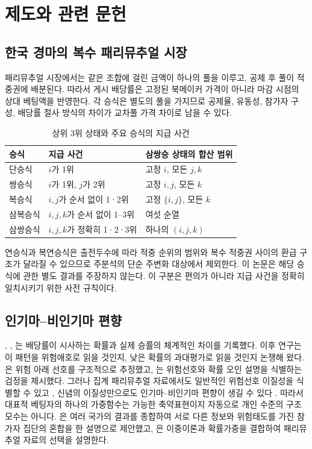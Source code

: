 \section{제도와 관련 문헌}

\subsection{한국 경마의 복수 패리뮤추얼 시장}

패리뮤추얼 시장에서는 같은 조합에 걸린 금액이 하나의 풀을 이루고, 공제 후
풀이 적중권에 배분된다. 따라서 게시 배당률은 고정된 북메이커 가격이 아니라
마감 시점의 상대 베팅액을 반영한다. 각 승식은 별도의 풀을 가지므로 공제율,
유동성, 참가자 구성, 배당률 절사 방식의 차이가 교차풀 가격 차이로 남을 수
있다.

\begin{table}[htbp]
\centering
\caption{상위 3위 상태와 주요 승식의 지급 사건}
\label{tab:market-events}
\begin{tabular}{lll}
\toprule
승식 & 지급 사건 & 삼쌍승 상태의 합산 범위 \\
\midrule
단승식 & $i$가 1위 & 고정 $i$, 모든 $j,k$ \\
쌍승식 & $i$가 1위, $j$가 2위 & 고정 $i,j$, 모든 $k$ \\
복승식 & $i,j$가 순서 없이 1·2위 & 고정 $\{i,j\}$, 모든 $k$ \\
삼복승식 & $i,j,k$가 순서 없이 1--3위 & 여섯 순열 \\
삼쌍승식 & $i,j,k$가 정확히 1·2·3위 & 하나의 $(i,j,k)$ \\
\bottomrule
\end{tabular}
\end{table}

연승식과 복연승식은 출전두수에 따라 적중 순위의 범위와 복수 적중권 사이의
환급 구조가 달라질 수 있으므로 주분석의 단순 주변화 대상에서 제외한다. 이
논문은 해당 승식에 관한 별도 결과를 주장하지 않는다. 이 구분은 편의가 아니라
지급 사건을 정확히 일치시키기 위한 사전 규칙이다.

\subsection{인기마--비인기마 편향}

\citet{griffith1949}, \citet{weitzman1965}, \citet{ali1977}는 배당률이
시사하는 확률과 실제 승률의 체계적인 차이를 기록했다. 이후 연구는 이 패턴을
위험애호로 읽을 것인지, 낮은 확률의 과대평가로 읽을 것인지 논쟁해 왔다.
\citet{julliensalanie2000}은 위험 아래 선호를 구조적으로 추정했고,
\citet{snowbergwolfers2010}는 위험선호와 확률 오인 설명을 식별하는 검정을
제시했다. 그러나 집계 패리뮤추얼 자료에서도 일반적인 위험선호 이질성을
식별할 수 있고 \citep{chiapporietal2019}, 신념의 이질성만으로도
인기마--비인기마 편향이 생길 수 있다 \citep{gandhiserranopadial2015}.
따라서 대표적 베팅자의 하나의 가중함수는 가능한 축약표현이지 자동으로 개인
수준의 구조모수는 아니다. \citet{coleman2004}은 여러 국가의 결과를 종합하여 서로 다른 정보와
위험태도를 가진 참가자 집단의 혼합을 한 설명으로 제안했고,
\citet{suhonenetal2018}은 이중이론과 확률가중을 결합하여 패리뮤추얼 자료의
선택을 설명한다.

